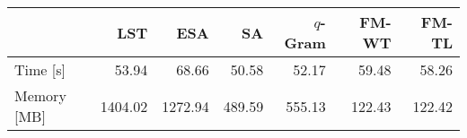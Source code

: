     \begin{tabular}{lrrrrrr}
    \toprule
    ~                       & LST		& ESA 		& SA 		& $q$-Gram		& FM-WT			&	FM-TL \\
    \midrule
    Time [s] 	            & 53.94		& 68.66		& 50.58		& 52.17			& 59.48			& 58.26      \\
    Memory [MB] 	        & 1404.02	& 1272.94	& 489.59	& 555.13		& 122.43		& 122.42      \\
    \bottomrule
    \end{tabular}
